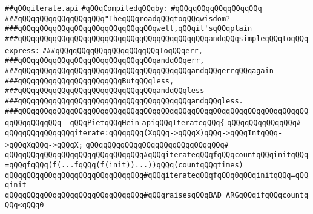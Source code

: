 \label{src/lib/src/iterate.api}
\verb|##qQQqiterate.api|\newline
\newline
\verb|#qQQqCompiledqQQqby:|\newline
\verb|#qQQqqQQqqQQqqQQqqQQq|\newline
\newline
\newline
\newline
\verb|###qQQqqQQqqQQqqQQqqQQq"TheqQQqroadqQQqtoqQQqwisdom?|\newline
\verb|###qQQqqQQqqQQqqQQqqQQqqQQqqQQqqQQqwell,qQQqit'sqQQqplain|\newline
\verb|###qQQqqQQqqQQqqQQqqQQqqQQqqQQqqQQqqQQqqQQqqQQqandqQQqsimpleqQQqtoqQQqexpress:|\newline
\verb|###qQQqqQQqqQQqqQQqqQQqqQQqToqQQqerr,|\newline
\verb|###qQQqqQQqqQQqqQQqqQQqqQQqqQQqqQQqandqQQqerr,|\newline
\verb|###qQQqqQQqqQQqqQQqqQQqqQQqqQQqqQQqqQQqqQQqandqQQqerrqQQqagain|\newline
\verb|###qQQqqQQqqQQqqQQqqQQqqQQqButqQQqless,|\newline
\verb|###qQQqqQQqqQQqqQQqqQQqqQQqqQQqqQQqandqQQqless|\newline
\verb|###qQQqqQQqqQQqqQQqqQQqqQQqqQQqqQQqqQQqqQQqandqQQqless.|\newline
\verb|###qQQqqQQqqQQqqQQqqQQqqQQqqQQqqQQqqQQqqQQqqQQqqQQqqQQqqQQqqQQqqQQqqQQqqQQqqQQqqQQq--qQQqPietqQQqHein|\newline
\newline
\newline
\newline
\verb|apiqQQqIterateqQQq{|\newline
\verb|qQQqqQQqqQQqqQQq#|\newline
\verb|qQQqqQQqqQQqqQQqiterate:qQQqqQQq(XqQQq->qQQqX)qQQq->qQQqIntqQQq->qQQqXqQQq->qQQqX;|\newline
\verb|qQQqqQQqqQQqqQQqqQQqqQQqqQQqqQQq#|\newline
\verb|qQQqqQQqqQQqqQQqqQQqqQQqqQQqqQQq#qQQqiterateqQQqfqQQqcountqQQqinitqQQq=qQQqfqQQq(f(...fqQQq(f(init))...))qQQq(countqQQqtimes)|\newline
\verb|qQQqqQQqqQQqqQQqqQQqqQQqqQQqqQQq#qQQqiterateqQQqfqQQq0qQQqinitqQQq=qQQqinit|\newline
\verb|qQQqqQQqqQQqqQQqqQQqqQQqqQQqqQQq#qQQqraisesqQQqBAD_ARGqQQqifqQQqcountqQQq<qQQq0|\newline
